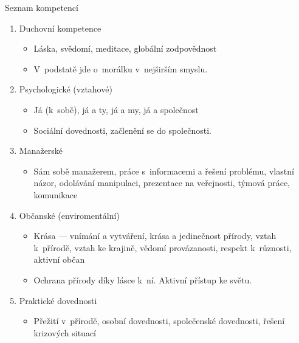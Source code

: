 \documentclass[compress,xelatex,xcolor=dvipsnames,hyperref={pdfpagelabels=false},print]{beamer}
\begin{document}
\begin{frame}{Seznam kompetencí}
\begin{enumerate}
\item Duchovní kompetence
 \begin{itemize}
 \item Láska, svědomí, meditace, globální zodpovědnost
 \item V~podstatě jde o~morálku v~nejširším smyslu.
 \end{itemize}
\item Psychologické (vztahové)
 \begin{itemize}
 \item Já (k~sobě), já a ty, já a my, já a společnost
 \item Sociální dovednosti, začlenění se do společnosti.
 \end{itemize}
\item Manažerské
 \begin{itemize}
 \item Sám sobě manažerem, práce s~informacemi a řešení problému, vlastní názor, odolávání manipulaci, prezentace na veřejnosti, týmová práce, komunikace
 \end{itemize}
\item Občanské (enviromentální)
 \begin{itemize}
 \item Krása --- vnímání a vytváření, krása a jedinečnost přírody, vztah k~přírodě, vztah ke krajině, vědomí provázanosti, respekt k~různosti, aktivní občan
 \item Ochrana přírody díky lásce k~ní. Aktivní přístup ke světu.
 \end{itemize}
\item Praktické dovednosti
 \begin{itemize}
 \item Přežití v~přírodě, osobní dovednosti, společenské dovednosti, řešení krizových situací
 \end{itemize}
\end{enumerate}
\end{frame}
\end{document}
